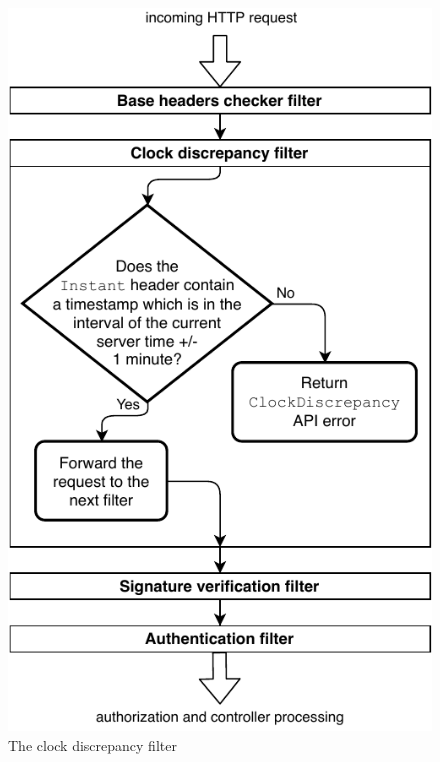 \begin{figure}[!htb]
    \includegraphics[width=\textwidth]{figures/clock-discrepancy-filter.pdf}
    \caption{The clock discrepancy filter}
    \label{fig:clock-discrepancy-filter}
\end{figure}

